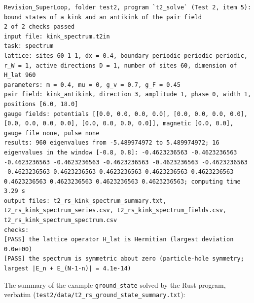 \documentclass[
  10pt,
]{article}
\begin{document}
\begin{verbatim}
Revision_SuperLoop, folder test2, program `t2_solve` (Test 2, item 5): bound states of a kink and an antikink of the pair field
2 of 2 checks passed
input file: kink_spectrum.t2in
task: spectrum
lattice: sites 60 1 1, dx = 0.4, boundary periodic periodic periodic, r_W = 1, active directions D = 1, number of sites 60, dimension of H_lat 960
parameters: m = 0.4, mu = 0, g_v = 0.7, g_F = 0.45
pair field: kink_antikink, direction 3, amplitude 1, phase 0, width 1, positions [6.0, 18.0]
gauge fields: potentials [[0.0, 0.0, 0.0, 0.0], [0.0, 0.0, 0.0, 0.0], [0.0, 0.0, 0.0, 0.0], [0.0, 0.0, 0.0, 0.0]], magnetic [0.0, 0.0], gauge file none, pulse none
results: 960 eigenvalues from -5.489974972 to 5.489974972; 16 eigenvalues in the window [-0.8, 0.8]: -0.4623236563 -0.4623236563 -0.4623236563 -0.4623236563 -0.4623236563 -0.4623236563 -0.4623236563 -0.4623236563 0.4623236563 0.4623236563 0.4623236563 0.4623236563 0.4623236563 0.4623236563 0.4623236563 0.4623236563; computing time 3.29 s
output files: t2_rs_kink_spectrum_summary.txt, t2_rs_kink_spectrum_series.csv, t2_rs_kink_spectrum_fields.csv, t2_rs_kink_spectrum_spectrum.csv
checks:
[PASS] the lattice operator H_lat is Hermitian (largest deviation 0.0e+00)
[PASS] the spectrum is symmetric about zero (particle-hole symmetry; largest |E_n + E_(N-1-n)| = 4.1e-14)
\end{verbatim}

The summary of the example \texttt{ground\_state} solved by the Rust
program, verbatim
(\texttt{test2/data/t2\_rs\_ground\_state\_summary.txt}):
\end{document}
